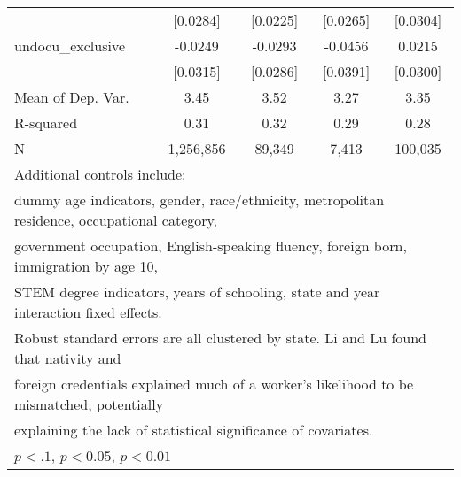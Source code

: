 \begin{table}[htbp]
\begin{tabular}{l*{4}{c}}
                    &    [0.0284]         &    [0.0225]         &    [0.0265]         &    [0.0304]         \\
\addlinespace
undocu\_exclusive    &     -0.0249         &     -0.0293         &     -0.0456         &      0.0215         \\
                    &    [0.0315]         &    [0.0286]         &    [0.0391]         &    [0.0300]         \\
\midrule
Mean of Dep. Var.   &        3.45         &        3.52         &        3.27         &        3.35         \\
R-squared           &        0.31         &        0.32         &        0.29         &        0.28         \\
N                   &   1,256,856         &      89,349         &       7,413         &     100,035         \\
\bottomrule
\multicolumn{5}{l}{\footnotesize Additional controls include:}\\
\multicolumn{5}{l}{\footnotesize dummy age indicators, gender, race/ethnicity, metropolitan residence, occupational category,}\\
\multicolumn{5}{l}{\footnotesize government occupation, English-speaking fluency, foreign born, immigration by age 10,}\\
\multicolumn{5}{l}{\footnotesize STEM degree indicators, years of schooling, state and year interaction fixed effects.}\\
\multicolumn{5}{l}{\footnotesize Robust standard errors are all clustered by state. Li and Lu found that nativity and}\\
\multicolumn{5}{l}{\footnotesize foreign credentials explained much of a worker's likelihood to be mismatched, potentially}\\
\multicolumn{5}{l}{\footnotesize explaining the lack of statistical significance of covariates.}\\
\multicolumn{5}{l}{\footnotesize \sym{*} \(p<.1\), \sym{**} \(p<0.05\), \sym{***} \(p<0.01\)}\\
\end{tabular}
\end{table}
